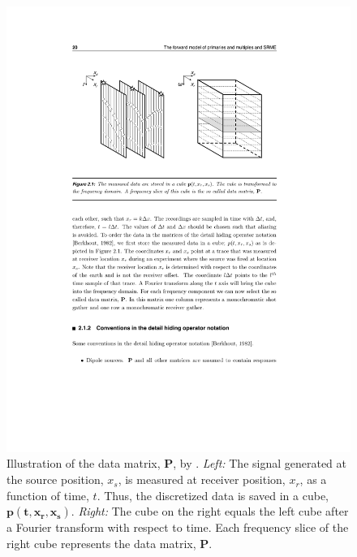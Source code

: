 \begin{figure}
    \centering
	\includegraphics{Plots/P-Groenestijn_2010}
	\caption{Illustration of the data matrix, $\mathbf{P}$, by \citet{Groenestijn_2010}. \textit{Left:} The signal generated at the source position, $x_s$, is measured at receiver position, $x_r$, as a function of time, $t$. Thus, the discretized data is saved in a cube, $\mathbf{p(t,x_r,x_s)}$. \textit{Right:} The cube on the right equals the left cube after a Fourier transform with respect to time. Each frequency slice of the right cube represents the data matrix, $\mathbf{P}$.}
	\label{fig:Ch-Theory-DataMatrix}
\end{figure}



